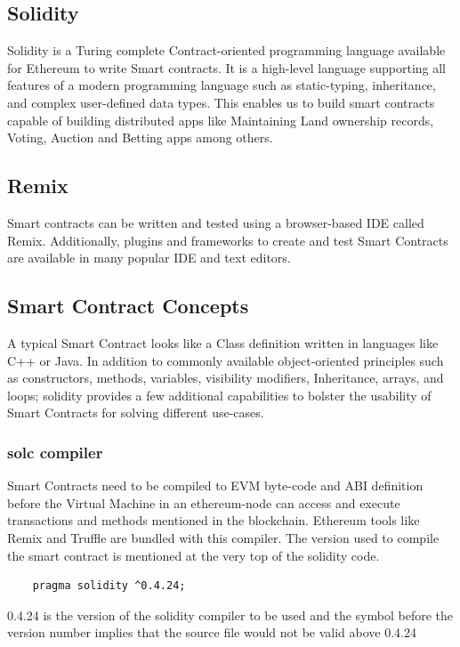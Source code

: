 \documentclass[11pt,openright]{report}
\begin{document}
\subsection{Solidity}
Solidity is a Turing complete Contract-oriented programming language available for Ethereum to write Smart contracts. It is a high-level language supporting all features of a modern programming language such as static-typing, inheritance, and complex user-defined data types. This enables us to build smart contracts capable of building distributed apps like Maintaining Land ownership records, Voting, Auction and Betting apps among others.

\subsection{Remix}
Smart contracts can be written and tested using a browser-based IDE called Remix. Additionally, plugins and frameworks to create and test Smart Contracts are available in many popular IDE and text editors.

\subsection{Smart Contract Concepts}
A typical Smart Contract looks like a Class definition written in languages like C++ or Java. In addition to commonly available object-oriented principles such as constructors, methods, variables, visibility modifiers, Inheritance, arrays, and loops; solidity provides a few additional capabilities to bolster the usability of Smart Contracts for solving different use-cases.

\subsubsection{solc compiler}
Smart Contracts need to be compiled to EVM byte-code and ABI definition before the Virtual Machine in an ethereum-node can access and execute transactions and methods mentioned in the blockchain. Ethereum tools like Remix and Truffle are bundled with this compiler. The version used to compile the smart contract is mentioned at the very top of the solidity code.

\begin{verbatim}
    pragma solidity ^0.4.24;
\end{verbatim}

0.4.24 is the version of the solidity compiler to be used and the symbol before the version number implies that the source file would not be valid above 0.4.24
\end{document}
